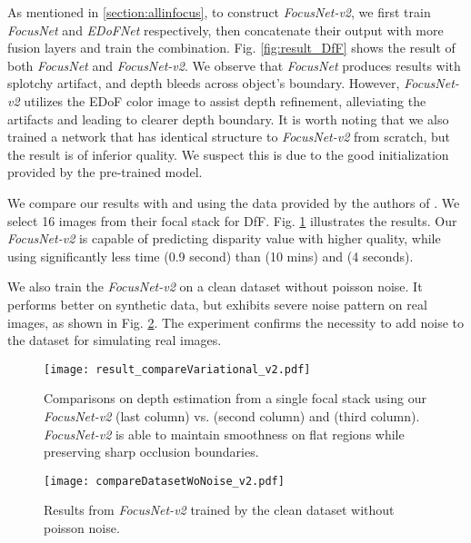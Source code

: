 \documentclass[10pt,twocolumn,letterpaper]{article}
\begin{document}
As mentioned in \ref{section:allinfocus}, to construct \emph{FocusNet-v2}, we first train \emph{FocusNet} and \emph{EDoFNet} respectively, then concatenate their output with more fusion layers and train the combination. Fig. \ref{fig:result_DfF} shows the result of both \emph{FocusNet}
and \emph{FocusNet-v2}. We observe that \emph{FocusNet} produces results with splotchy artifact, and depth bleeds across object's boundary. However,
\emph{FocusNet-v2} utilizes the EDoF color image to assist depth refinement, alleviating the artifacts and leading to clearer
depth boundary. It is worth noting that we also trained a network that
has identical structure to \emph{FocusNet-v2} from scratch, but the result is of inferior quality. We suspect this is due to the good initialization provided by the pre-trained model.

We compare our results with \cite{suwajanakorn15} and \cite{moeller15} using the data provided by the authors of \cite{suwajanakorn15}. We select 16 images from their focal stack for DfF. Fig. \ref{fig:result_compareVariation} illustrates the results. Our \emph{FocusNet-v2} is capable of predicting disparity value with higher quality, while using significantly less time (0.9 second) than \cite{suwajanakorn15} (10 mins) and \cite{moeller15} (4 seconds).

We also train the \emph{FocusNet-v2} on a clean dataset without poisson noise. It performs better on synthetic data, but exhibits severe noise pattern on real images, as shown in Fig. \ref{fig:result_datasetWoNoise}. The experiment confirms the necessity to add noise to the dataset for simulating real images.

\begin{figure}[t]
\begin{center}
   \texttt{[image: result\_compareVariational\_v2.pdf]}
\end{center}
\vspace{-8pt}
   \caption{Comparisons on depth estimation from a single focal stack using our \emph{FocusNet-v2} (last column) vs. \cite{suwajanakorn15} (second column) and \cite{moeller15} (third column). \emph{FocusNet-v2} is able to maintain smoothness on flat regions while preserving sharp occlusion boundaries.}
\label{fig:result_compareVariation}
\end{figure}

\begin{figure}[t]
\begin{center}
   \texttt{[image: compareDatasetWoNoise\_v2.pdf]}
\end{center}
\vspace{-8pt}
   \caption{Results from \emph{FocusNet-v2} trained by the clean dataset without poisson noise.}
\label{fig:result_datasetWoNoise}
\end{figure}
\end{document}
